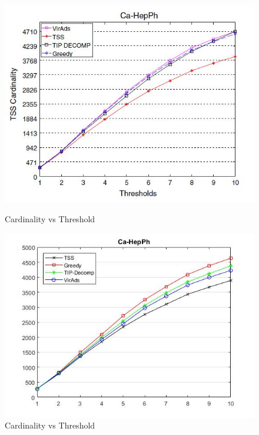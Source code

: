 \begin{figure}[h!]
\begin{minipage}[t]{0.50\textwidth}
\includegraphics[width=\linewidth,keepaspectratio=true]{images/ca-hepphpaper.jpg}
\caption{Cardinality vs Threshold}

\end{minipage}
\begin{minipage}[t]{0.50\textwidth}
\includegraphics[width=\linewidth,keepaspectratio=true]{images/ca-hepphresult.jpg}
\caption{Cardinality vs Threshold}
\end{minipage}
\end{figure}

